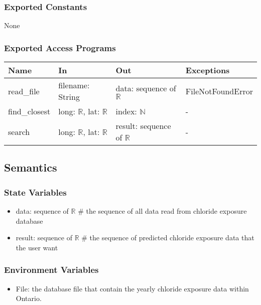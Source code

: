 \documentclass[12pt, titlepage]{article}
\begin{document}
\subsubsection{Exported Constants}
None
\subsubsection{Exported Access Programs}

\begin{center}
\begin{tabular}{p{2cm} p{4cm} p{4cm} p{4cm}}
\hline
\textbf{Name} & \textbf{In} & \textbf{Out} & \textbf{Exceptions} \\
\hline
read\_file & filename: String & data: sequence of $\mathbb{R}$ & FileNotFoundError \\
find\_closest & long: $\mathbb{R}$, lat: $\mathbb{R}$ & index: $\mathbb{N}$   & - \\
search & long: $\mathbb{R}$, lat: $\mathbb{R}$  & result: sequence of  $\mathbb{R}$ & - \\
\hline
\end{tabular}
\end{center}

\subsection{Semantics}

\subsubsection{State Variables}
\begin{itemize}
\item data: sequence of $\mathbb{R}$ \# the sequence of all data read from chloride exposure database
\item result: sequence of $\mathbb{R}$ \# the sequence of predicted chloride exposure data that the user want

\end{itemize}

\subsubsection{Environment Variables}
\begin{itemize}
\item File: the database file that contain the yearly chloride exposure data within Ontario.
\end{itemize}
\end{document}
